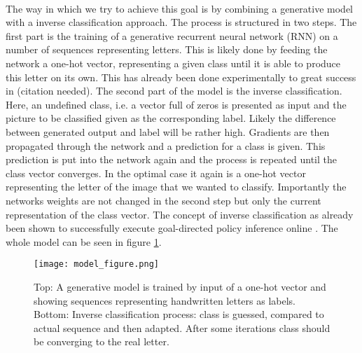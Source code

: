 \begin{titlepage}
\\
The way in which we try to achieve this goal is by combining a generative model with a inverse classification approach. The process is structured in two steps. The first part is the training of a generative recurrent neural network (RNN) on a number of sequences representing letters. This is likely done by feeding the network a one-hot vector, representing a given class until it is able to produce this letter on its own. This has already been done experimentally to great success in (citation needed). The second part of the model is the inverse classification. Here, an undefined class, i.e. a vector full of zeros is presented as input and the picture to be classified given as the corresponding label. Likely the difference between generated output and label will be rather high. Gradients are then propagated through the network and a prediction for a class is given. This prediction is put into the network again and the process is repeated until the class vector converges. In the optimal case it again is a one-hot vector representing the letter of the image that we wanted to classify. Importantly the networks weights are not changed in the second step but only the current representation of the class vector. The concept of inverse classification as already been shown to successfully execute goal-directed policy inference online \cite{RocketballOtte2017}. The whole model can be seen in figure \ref{model_figure}.\\
\begin{figure}
	\begin{minipage}[c]{0.67\textwidth}
		\texttt{[image: model\_figure.png]}
	\end{minipage}\hfill
	\begin{minipage}[c]{0.33\textwidth}
			\caption{\small{Top: A generative model is trained by input of a one-hot vector and showing sequences representing handwritten letters as labels. \\
					Bottom: Inverse classification process: class is guessed, compared to actual sequence and then adapted. After some iterations class should be converging to the real letter.}}
			\label{model_figure}
	\end{minipage}
\end{figure}
\begin{figure}[!h]
	
	

\end{figure}


\end{titlepage}
